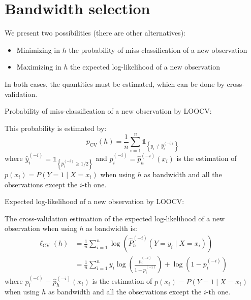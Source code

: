 \pagebreak
\section{Bandwidth selection}
We present two possibilities (there are other alternatives):
\begin{itemize}
    \item Minimizing in $h$ the probability of miss-classification of a new observation
    \item Maximizing in $h$ the expected log-likelihood of a new observation
\end{itemize}
In both cases, the quantities must be estimated, which can be done by cross-validation.

\begin{definition}{Probability of miss-classification}{} of a new observation
    by LOOCV:

    This probability is estimated by:
    \begin{equation*}
        p_\text{CV}(h) = \frac{1}{n} \sum_{i = 1}^n \mathds{1}_{\left\{y_i \neq \hat{y}_i^{(-i)}\right\}}
    \end{equation*}
    where $\hat{y}_i^{(-i)} = \mathds{1}_{\left\{\hat{p}_i^{(-i)} \geq 1/2\right\}}$ and
    $p_i^{(-i)} = \hat p_h^{(-i)}(x_i)$ is the estimation of
    $p(x_i) = P(Y = 1 \mid X = x_i)$ when using $h$ as bandwidth and all the observations
    except the $i$-th one.
\end{definition}

\begin{definition}{Expected log-likelihood}{} of a new observation by LOOCV:

    The cross-validation estimation of the expected log-likelihood of
    a new observation when using $h$ as bandwidth is:
    \begin{align*}
        \ell_\text{CV}(h) &= \frac{1}{n} \sum_{i = 1}^n \log\left(
            \widehat{P}_h^{(-i)}(Y = y_i \mid X = x_i)
        \right) \\
                          &= \frac{1}{n} \sum_{i = 1}^n 
                              y_i \log\left(
                                  \frac{{p}_i^{(-i)}}{1 - {p}_i^{(-i)}}
                              \right) + \log\left(1 - {p}_i^{(-i)}\right)
    \end{align*}
    where ${p}_i^{(-i)} = \hat p_h^{(-i)}(x_i)$ is the estimation of
    $p(x_i) = P(Y = 1 \mid X = x_i)$ when using $h$ as bandwidth and all the observations
    except the $i$-th one.
\end{definition}
